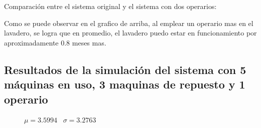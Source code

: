 \documentclass[12pt]{article}
\begin{document}
Comparación entre el sistema original y el sistema con dos operarios: 

\begin{figure}[hbt]
\noindent{}
\end{figure}

Como se puede observar en el grafico de arriba, al emplear un operario mas en el lavadero, se logra que en promedio, el lavadero puedo estar en funcionamiento por aproximadamente 0.8 meses mas.

\pagebreak

\subsection{Resultados de la simulación del sistema con 5 máquinas en uso, 3 maquinas de repuesto y 1 operario}

\begin{figure}[hbt]
\noindent{}
\centerline{$\mu= 3.5994$  \  $\sigma =3.2763$}

\end{figure}
\end{document}
